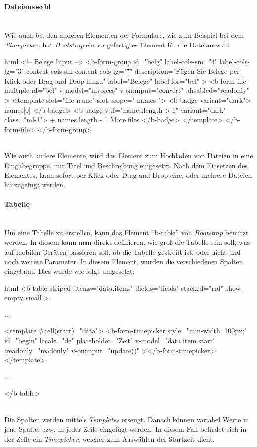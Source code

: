\paragraph{Dateiauswahl}
~\\
Wie auch bei den anderen Elementen der Formulare, wie zum Beispiel bei dem \textit{Timepicker}, hat \textit{Bootstrap} ein vorgefertigtes Element für die Dateiauswahl. 
\begin{code}{html}
	<!-- Belege Input -->
	<b-form-group
	  id="belg"
	  label-cols-sm="4"
	  label-cols-lg="3"
	  content-cols-sm
	  content-cols-lg="7"
	  description="Fügen Sie Belege per Klick oder Drag and Drop hinzu"
	  label="Belege"
	  label-for="bel"
	>
	  <b-form-file
		multiple
		id="bel"
		v-model="invoices"
		v-on:input="convert"
		:disabled="readonly"
	  >
		<template slot="file-name" slot-scope="{ names }">
		  <b-badge variant="dark">{{ names[0] }}</b-badge>
		  <b-badge v-if="names.length > 1" variant="dark" class="ml-1">
			+ {{ names.length - 1 }} More files
		  </b-badge>
		</template>
	  </b-form-file>
	</b-form-group>
\end{code}
	\label{list:dateiselect} ~\\
Wie auch andere Elemente, wird das Element zum Hochladen von Dateien in eine Eingabegruppe, mit Titel und Beschreibung eingesetzt. Nach dem Einsetzen des Elementes, kann sofort per Klick oder Drag and Drop eine, oder mehrere Dateien hinzugefügt werden.
\paragraph{Tabelle}
~\\
Um eine Tabelle zu erstellen, kann das Element \enquote{b-table} von \textit{Bootstrap} benutzt werden. In diesem kann man direkt definieren, wie groß die Tabelle sein soll, was auf mobilen Geräten passieren soll, ob die Tabelle gestreift ist, oder nicht und noch weitere Parameter. In diesem Element, wurden die verschiedenen Spalten eingebaut. Dies wurde wie folgt umgesetzt:
\begin{code}{html}
	<b-table
          striped
          :items="data.items"
          :fields="fields"
          stacked="md"
          show-empty
          small
    >

		...

		<template #cell(start)="data">
			<b-form-timepicker
				style="min-width: 100px;"
				id="begin"
				locale="de"
				placeholder="Zeit"
				v-model="data.item.start"
				:readonly="readonly"
				v-on:input="update()"
			></b-form-timepicker>
		</template>

		...

	</b-table>
\end{code}
	\label{list:bsptable} ~\\
Die Spalten werden mittels \textit{Templates} erzeugt. Danach können variabel Werte in jene Spalte, bzw. in jeder Zeile eingefügt werden. In diesem Fall befindet sich in der Zelle ein \textit{Timepicker}, welcher zum Auswählen der Startzeit dient.
\newpage
